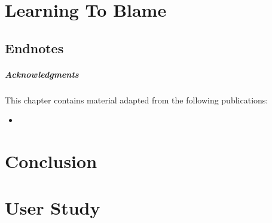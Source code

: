 \documentclass[11pt]{ucsddissertation}
\theoremstyle{plain}%
\theoremstyle{definition}
\begin{document}
%
%
%
%
%
%
%

\chapter{Learning To Blame}
\label{chp:nate}
\renewcommand\toolname{\tool{Nate}}
\renewcommand\lang{\ensuremath{\lambda^{ML}}}








%
\section*{Endnotes}
\paragraph{Acknowledgments}
This chapter contains material adapted from the following publications:
\begin{itemize}
\item {}
\end{itemize}

\chapter{Conclusion}


\appendix



\chapter{ User Study}
\label{sec:nanomaly:user-study-exams}
% 
\newpage
\end{document}
